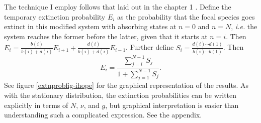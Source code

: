 The technique I employ follows that laid out in the chapter 1 \cite{Nisbet1982}. %
Define the temporary extinction probability $E_i$ as the probability that the focal species goes extinct in this modified system with absorbing states at $n=0$ and $n=N$, \emph{i.e.} the system reaches the former before the latter, given that it starts at $n=i$. 
Then $E_i = \frac{b(i)}{b(i)+d(i)}E_{i+1} + \frac{d(i)}{b(i)+d(i)}E_{i-1}$. 
Further define $S_i = \frac{d(i)\cdots d(1)}{b(i)\cdots b(1)}$. 
Then 
\begin{equation} \label{extnprob}
E_{i} = \frac{\sum_{j=i}^{N-1}S_j}{1+\sum_{j=1}^{N-1}S_j}. 
\end{equation}
See figure \ref{extnprobfig-ihope} for the graphical representation of the results. 
As with the stationary distribution, the extinction probabilities can be written explicitly in terms of $N$, $\nu$, and $g$, but graphical interpretation is easier than understanding such a complicated expression. %
See the appendix. 

